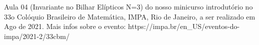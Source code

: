 Aula 04 (Invariante no Bilhar Elípticos N=3) do nosso minicurso introdutório no 33o Colóquio Brasileiro de Matemática, IMPA, Rio de Janeiro, a ser realizado em Ago de 2021. Mais infos sobre o evento: https://impa.br/en_US/eventos-do-impa/2021-2/33cbm/